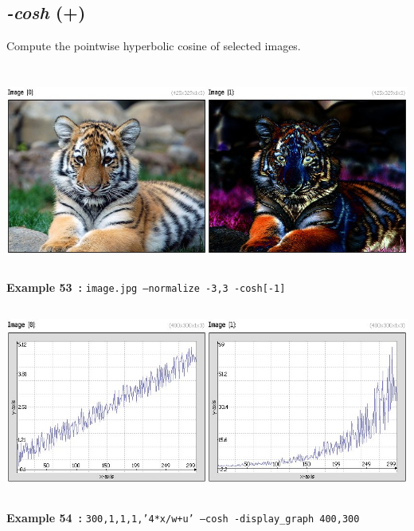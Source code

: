 \documentclass[a4paper,11pt,twoside]{book}
\begin{document}
\subsection{\emph{-cosh} (+)}\vspace*{-0.5em}
Compute the pointwise hyperbolic cosine of selected images.
\begin{center}\includegraphics[keepaspectratio=true,height=7cm,width=\textwidth]{img/gmic_def53.jpg}\\
{\footnotesize \textbf{Example 53~:} \texttt{image.jpg --normalize -3,3 -cosh[-1]}}
\\\includegraphics[keepaspectratio=true,height=7cm,width=\textwidth]{img/gmic_def54.jpg}\\
{\footnotesize \textbf{Example 54~:} \texttt{300,1,1,1,'4*x/w+u' --cosh -display\_graph 400,300}}
\end{center}
\end{document}
